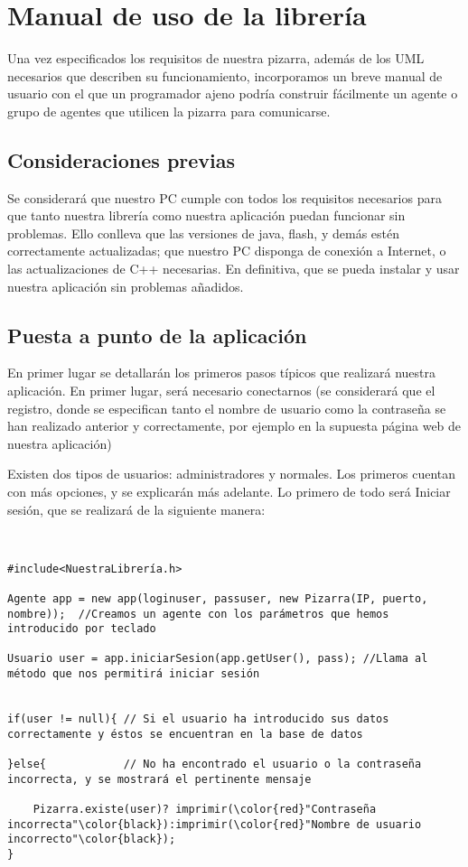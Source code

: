 \chapter{Manual de uso de la librería}
Una vez especificados los requisitos de nuestra pizarra, además de los UML necesarios que describen su funcionamiento, incorporamos un breve manual de usuario con el que un programador ajeno podría construir fácilmente un agente o grupo de agentes que utilicen la pizarra para comunicarse.

\section{Consideraciones previas}
Se considerará que nuestro PC cumple con todos los requisitos necesarios para que tanto nuestra librería como nuestra aplicación puedan funcionar sin problemas. Ello conlleva que las versiones de java, flash, y demás estén correctamente actualizadas; que nuestro PC disponga de conexión a Internet, o las actualizaciones de C++ necesarias. En definitiva, que se pueda instalar y usar nuestra aplicación sin problemas añadidos.
\section{Puesta a punto de la aplicación}
En primer lugar se detallarán los primeros pasos típicos que realizará nuestra aplicación. En primer lugar, será necesario conectarnos (se considerará que el registro, donde se especifican tanto el nombre de usuario como la contraseña se han realizado anterior y correctamente, por ejemplo en la supuesta página web de nuestra aplicación) 

Existen dos tipos de usuarios: administradores y normales. Los primeros cuentan con más opciones, y se explicarán más adelante. Lo primero de todo será Iniciar sesión, que se realizará de la siguiente manera:
\begin{verbatim}


#include<NuestraLibrería.h>

Agente app = new app(loginuser, passuser, new Pizarra(IP, puerto, nombre));  //Creamos un agente con los parámetros que hemos introducido por teclado

Usuario user = app.iniciarSesion(app.getUser(), pass); //Llama al método que nos permitirá iniciar sesión


if(user != null){ // Si el usuario ha introducido sus datos correctamente y éstos se encuentran en la base de datos

}else{            // No ha encontrado el usuario o la contraseña incorrecta, y se mostrará el pertinente mensaje 

    Pizarra.existe(user)? imprimir(\color{red}"Contraseña incorrecta"\color{black}):imprimir(\color{red}"Nombre de usuario incorrecto"\color{black});
}
\end{verbatim}

